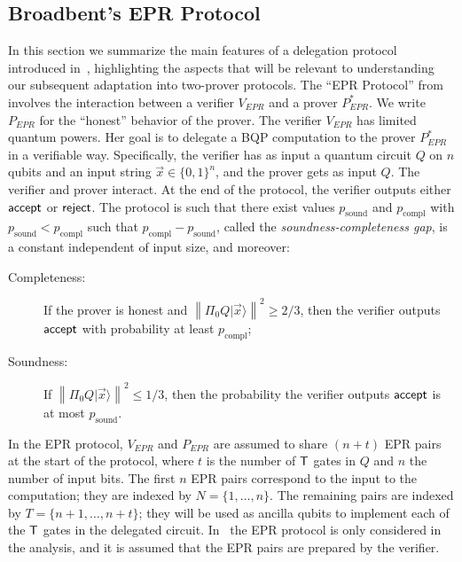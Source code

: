 \documentclass{toc}
\newcommand{\ket}[1]{|#1\rangle}
\DeclareMathOperator{\sound}{sound}
\DeclareMathOperator{\compl}{compl}
\newcommand{\norm}[1]{\left\|#1\right\|}
\begin{document}
\subsection{Broadbent's EPR Protocol}
\label{sec:EPR-protocol}


In this section we summarize the main features of a delegation protocol introduced in~\cite{broadbent15howtoverify}, highlighting the aspects that will be relevant to understanding our subsequent adaptation into two-prover protocols. The ``EPR Protocol'' from \cite{broadbent15howtoverify} involves the interaction between a verifier $V_{EPR}$ and a prover $P_{EPR}^*$. We write $P_{EPR}$ for the ``honest'' behavior of the prover. The verifier $V_{EPR}$ has limited quantum powers. Her goal is to delegate a BQP computation to the prover $P_{EPR}^*$ in a verifiable way. Specifically, the verifier has as input a quantum circuit $Q$ on $n$ qubits and an input string $\vec{x}\in\{0,1\}^n$, and the prover gets as input $Q$. The verifier and prover interact. At the end of the protocol, the verifier outputs either $\sf accept$ or $\sf reject$. The protocol is such that there exist values $p_{\sound}$ and $p_{\compl}$ with $p_{\sound}< p_{\compl}$ such that $p_{\compl}-p_{\sound}$, called the \emph{soundness-completeness gap}, is a constant independent of input size, and moreover:

\begin{description}
\item[Completeness:] If the prover is honest and $\norm{\Pi_0Q\ket{\vec{x}}}^2 \geq 2/3$, then the verifier outputs $\sf accept$ with probability at least $p_{\compl}$;  
\item[Soundness:] If $\norm{\Pi_0Q\ket{\vec{x}}}^2 \leq 1/3$, then the probability the verifier outputs $\sf accept$ is at most $p_{\sound}$.
\end{description}





In the EPR protocol, $V_{EPR}$ and $P_{EPR}$ are assumed to share $(n+t)$ EPR pairs at the start of the protocol, where $t$ is the number of $\sf T$ gates in $Q$ and $n$ the number of input bits. 
 The first $n$ EPR pairs correspond to the input to the computation; they are indexed by $N=\{1,\dots,n\}$. The remaining pairs are indexed by $T=\{n+1,\dots,n+t\}$; they will be used as ancilla qubits to  implement each of the $\sf T$ gates in the delegated circuit. 
 In~\cite{broadbent15howtoverify} the EPR protocol is only considered in the analysis, and it is assumed that the EPR pairs are prepared by the verifier.
\end{document}
